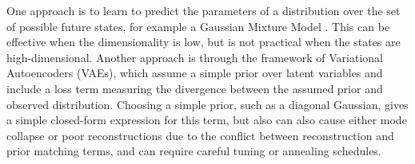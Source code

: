 \documentclass{article}
\begin{document}
One approach is to learn to predict the parameters of a distribution over the set of possible future states, for example a Gaussian Mixture Model \citep{mixture-density-networks}.
This can be effective when the dimensionality is low, but is not practical when the states are high-dimensional.
Another approach is through the framework of Variational Autoencoders (VAEs), which assume a simple prior over latent variables and include a loss term measuring the divergence between the assumed prior and observed distribution.
Choosing a simple prior, such as a diagonal Gaussian, gives a simple closed-form expression for this term, but also can also cause either mode collapse or poor reconstructions due to the conflict between reconstruction and prior matching terms, and can require careful tuning or annealing schedules.
\end{document}
